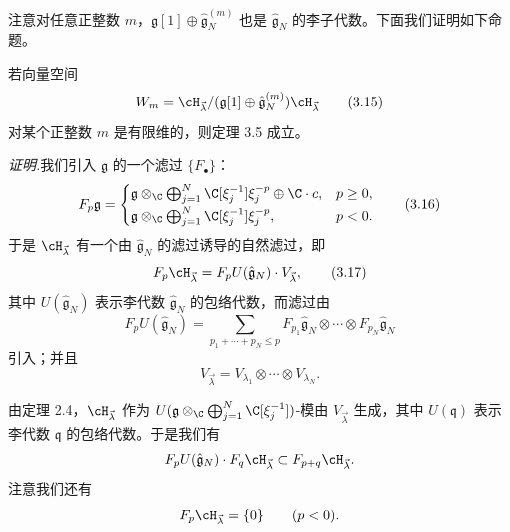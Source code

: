 注意对任意正整数 $m$，$\mathfrak{g}[1]\oplus\hat{\mathfrak{g}}_N^{(m)}$ 也是 $\hat{\mathfrak{g}}_N$ 的李子代数。下面我们证明如下命题。

\begin{proposition}[3.6]
若向量空间
\begin{equation}
W_m=\cH_{\vec{\lambda}}/(\mathfrak{g}[1]\oplus\hat{\mathfrak{g}}_N^{(m)})\cH_{\vec{\lambda}} \tag{3.15}
\end{equation}
对某个正整数 $m$ 是有限维的，则定理 3.5 成立。
\end{proposition}

\noindent\textit{证明.}\quad 我们引入 $\mathfrak{g}$ 的一个滤过 $\{F_\bullet\}$：
\begin{equation}
F_p\mathfrak{g}=
\begin{cases}
\mathfrak{g}\otimes_{\C}\bigoplus_{j=1}^{N}\C[\xi_j^{-1}]\xi_j^{-p}\oplus\C\cdot c, & p\ge0,\\[2pt]
\mathfrak{g}\otimes_{\C}\bigoplus_{j=1}^{N}\C[\xi_j^{-1}]\xi_j^{-p}, & p<0.
\end{cases} \tag{3.16}
\end{equation}
于是 $\cH_{\vec{\lambda}}$ 有一个由 $\hat{\mathfrak{g}}_N$ 的滤过诱导的自然滤过，即
\begin{equation}
F_p\cH_{\vec{\lambda}}=F_pU(\hat{\mathfrak{g}}_N)\cdot V_{\vec{\lambda}}, \tag{3.17}
\end{equation}
其中 $U(\hat{\mathfrak{g}}_N)$ 表示李代数 $\hat{\mathfrak{g}}_N$ 的包络代数，而滤过由
\[
F_pU(\hat{\mathfrak{g}}_N)=\sum_{p_1+\cdots+p_N\le p}F_{p_1}\hat{\mathfrak{g}}_N\otimes\cdots\otimes F_{p_N}\hat{\mathfrak{g}}_N
\]
引入；并且
\[
V_{\vec{\lambda}}=V_{\lambda_1}\otimes\cdots\otimes V_{\lambda_N}.
\]


由定理 2.4，$\cH_{\vec{\lambda}}$ 作为 $U(\mathfrak{g}\otimes_{\C}\bigoplus_{j=1}^{N}\C[\xi_j^{-1}])$-模由 $V_{\vec{\lambda}}$ 生成，其中 $U(\mathfrak{q})$ 表示李代数 $\mathfrak{q}$ 的包络代数。于是我们有
\[
F_pU(\hat{\mathfrak{g}}_N)\cdot F_q\cH_{\vec{\lambda}}\subset F_{p+q}\cH_{\vec{\lambda}}.
\]
注意我们还有
\[
F_p\cH_{\vec{\lambda}}=\{0\}\qquad(p<0).
\]

